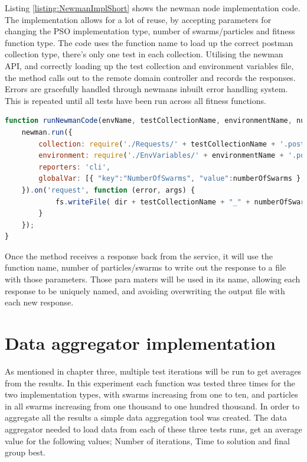 \documentclass[oneside,12pt]{book}
\begin{document}
Listing \ref{listing:NewmanImplShort} shows the newman node implementation code. The implementation allows for a lot of reuse, by accepting parameters for changing the PSO implementation type, number of swarms/particles and fitness function type. The code uses the function name to load up the correct postman collection type, there's only one test in each collection. Utilising the newman API, and correctly loading up the test collection and environment variables file, the method calls out to the remote domain controller and records the responses. Errors are gracefully handled through newmans inbuilt error handling system. This is repeated until all tests have been run across all fitness functions. 

\begin{lstlisting}[basicstyle=\footnotesize, language=JavaScript]
function runNewmanCode(envName, testCollectionName, environmentName, numberOfSwarms, numberOfParticles, baseUrlsSting, endpoint) {
    newman.run({
        collection: require('./Requests/' + testCollectionName + '.postman_collection.json'),
        environment: require('./EnvVariables/' + environmentName + '.postman_environment.json'),
        reporters: 'cli',
        globalVar: [{ "key":"NumberOfSwarms", "value":numberOfSwarms }, {"key":"endpoint", "value": endpoint}, { "key":"NumberOfParticles", "value": numberOfParticles}, { "key":"BaseUrls", "value": baseUrlsSting}]
    }).on('request', function (error, args) {
            fs.writeFile( dir + testCollectionName + "_" + numberOfSwarms + "_" + numberOfParticles + '.result.json', args.response.stream, function (error)
        }
    });
}
\end{lstlisting}
\label{listing:NewmanImplShort}

Once the method receives a response back from the service, it will use the function name, number of particles/swarms to write out the response to a file with those parameters. Those para maters will be used in its name, allowing each response to be uniquely named, and avoiding overwriting the output file with each new response. 

\section{Data aggregator implementation}
As mentioned in chapter three, multiple test iterations will be run to get averages from the results. In this experiment each function was tested three times for the two implementation types, with swarms increasing from one to ten, and particles in all swarms increasing from one thousand to one hundred thousand. In order to aggregate all the results a simple data aggregation tool was created. The data aggregator needed to load data from each of these three tests runs, get an average value for the following values; Number of iterations, Time to solution and final group best. 
\end{document}
